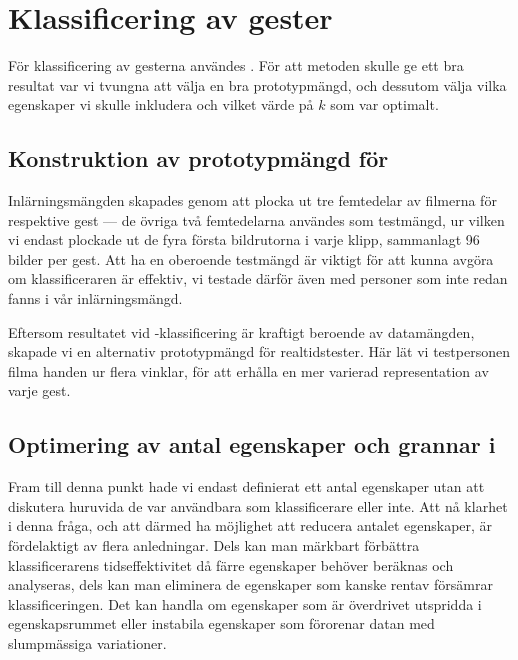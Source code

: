 \documentclass[../rapport_MVEX01-11-05]{subfiles}
\begin{document}
\section{Klassificering av gester} 

För klassificering av gesterna användes \knn. För att metoden skulle
ge ett bra resultat var vi tvungna att välja
en bra prototypmängd, och dessutom välja vilka egenskaper vi skulle inkludera
och vilket värde på $k$ som var optimalt.

\subsection{Konstruktion av prototypmängd för \knn}
Inlärningsmängden skapades genom att plocka ut tre femtedelar av filmerna för
respektive gest --- de övriga två femtedelarna
användes som testmängd, ur vilken vi endast plockade ut
de fyra första bildrutorna i varje klipp, sammanlagt 96 bilder per gest.
Att ha en oberoende testmängd är viktigt för att kunna avgöra om klassificeraren är
effektiv, vi testade därför även med personer som inte redan 
fanns i vår inlärningsmängd.

Eftersom resultatet vid \knn-klassificering är kraftigt beroende av datamängden,
skapade vi en alternativ prototypmängd för realtidstester.
Här lät vi testpersonen filma handen ur flera vinklar,
för att erhålla en mer varierad representation av varje gest.

\subsection{Optimering av antal egenskaper och grannar i \knn}\label{sec:metod_knn:optim}
Fram till denna punkt hade vi endast definierat ett antal egenskaper utan att
diskutera huruvida de var användbara som klassificerare eller inte. Att nå
klarhet i denna fråga, och att därmed ha möjlighet att reducera antalet
egenskaper, är
fördelaktigt av flera anledningar. Dels kan man märkbart förbättra
klassificerarens
tidseffektivitet då färre egenskaper behöver beräknas och analyseras, dels kan man
eliminera de egenskaper som kanske rentav försämrar klassificeringen.
Det kan handla om egenskaper som är överdrivet utspridda i
egenskapsrummet eller instabila egenskaper som förorenar datan med slumpmässiga
variationer.
\end{document}
